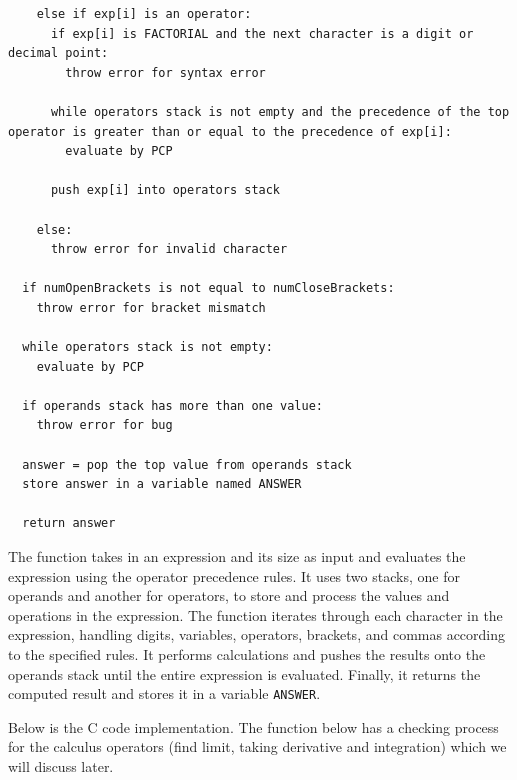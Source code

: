 \documentclass[a4paper, twoside]{report}
\begin{document}
\begin{verbatim}
    else if exp[i] is an operator:
      if exp[i] is FACTORIAL and the next character is a digit or decimal point:
        throw error for syntax error
      
      while operators stack is not empty and the precedence of the top operator is greater than or equal to the precedence of exp[i]:
        evaluate by PCP
      
      push exp[i] into operators stack
    
    else:
      throw error for invalid character
  
  if numOpenBrackets is not equal to numCloseBrackets:
    throw error for bracket mismatch
  
  while operators stack is not empty:
    evaluate by PCP
  
  if operands stack has more than one value:
    throw error for bug
  
  answer = pop the top value from operands stack
  store answer in a variable named ANSWER
  
  return answer
\end{verbatim}

The function takes in an expression and its size as input and evaluates the expression using the operator precedence rules. It uses two stacks, one for operands and another for operators, to store and process the values and operations in the expression. The function iterates through each character in the expression, handling digits, variables, operators, brackets, and commas according to the specified rules. It performs calculations and pushes the results onto the operands stack until the entire expression is evaluated. Finally, it returns the computed result and stores it in a variable \texttt{ANSWER}.

Below is the C code implementation. The function below has a checking process for the calculus operators (find limit, taking derivative and integration) which we will discuss later.
\end{document}
